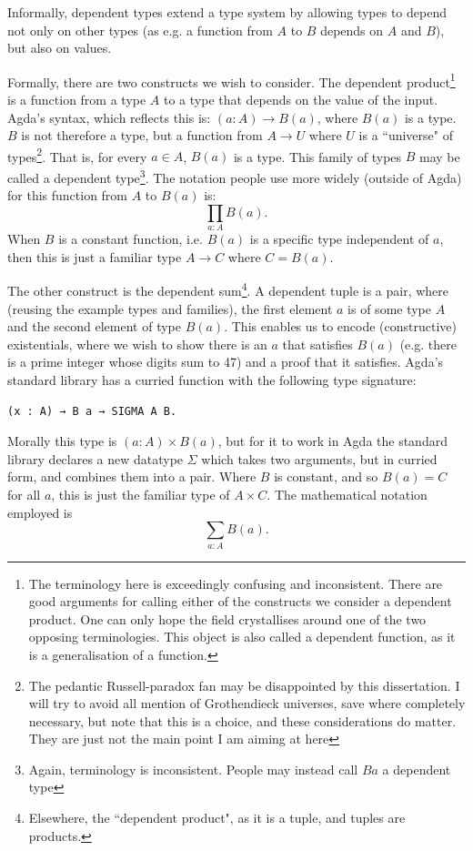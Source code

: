 \documentclass[12pt,a4paper,twoside,openright]{report}
\begin{document}
Informally, dependent types extend a type system by allowing types to depend not only on other types (as e.g. a function from $A$ to $B$ depends on $A$ and $B$), but also on values. 

Formally, there are two constructs we wish to consider. The dependent product\footnote{The terminology here is exceedingly confusing and inconsistent. There are good arguments for calling either of the constructs we consider a dependent product. One can only hope the field crystallises around one of the two opposing terminologies. This object is also called a dependent function, as it is a generalisation of a function.} is a function from a type $A$ to a type that depends on the value of the input. Agda's syntax, which reflects this is: $(a : A) \to B(a)$, where $B(a)$ is a type. $B$ is not therefore a type, but a function from $A \to U$ where $U$ is a ``universe" of types\footnote{The pedantic Russell-paradox fan may be disappointed by this dissertation. I will try to avoid all mention of Grothendieck universes, save where completely necessary, but note that this is a choice, and these considerations do matter. They are just not the main point I am aiming at here}. That is, for every $a \in A$, $B(a)$ is a type. This family of types $B$ may be called a dependent type\footnote{Again, terminology is inconsistent. People may instead call $B a$ a dependent type}. The notation people use more widely (outside of Agda) for this function from $A$ to $B(a)$ is:
\[
\prod_{a: A} B(a).
\]
When $B$ is a constant function, i.e. $B(a)$ is a specific type independent of $a$, then this is just a familiar type $A \to C$ where $C = B(a)$.

The other construct is the dependent sum\footnote{Elsewhere, the ``dependent product", as it is a tuple, and tuples are products.}. A dependent tuple is a pair, where (reusing the example types and families), the first element $a$ is of some type $A$ and the second element of type $B(a)$. This enables us to encode (constructive) existentials, where  we wish to show there is an $a$ that satisfies $B(a)$ (e.g. there is a prime integer whose digits sum to 47) and a proof that it satisfies. Agda's standard library has a curried function with the following type signature:
\begin{verbatim}
(x : A) → B a → SIGMA A B.
\end{verbatim} 
Morally this type is $(a : A) \times B(a)$, but for it to work in Agda the standard library declares a new datatype $\Sigma$ which takes two arguments, but in curried form, and combines them into a pair. Where $B$ is constant, and so $B(a) = C$ for all $a$, this is just the familiar type of $A \times C$. The mathematical notation employed is
\[
\sum_{a : A} B(a). 
\]
\end{document}
